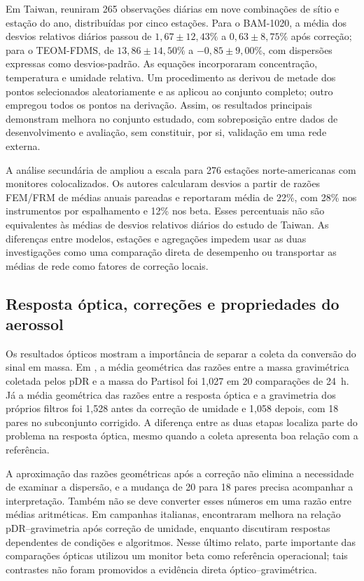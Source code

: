 Em Taiwan, \textcite{rsl085} reuniram 265 observações diárias em nove combinações de sítio e estação do ano, distribuídas por cinco estações. Para o BAM-1020, a média dos desvios relativos diários passou de $1{,}67\pm12{,}43\%$ a $0{,}63\pm8{,}75\%$ após correção; para o TEOM-FDMS, de $13{,}86\pm14{,}50\%$ a $-0{,}85\pm9{,}00\%$, com dispersões expressas como desvios-padrão. As equações incorporaram concentração, temperatura e umidade relativa. Um procedimento as derivou de metade dos pontos selecionados aleatoriamente e as aplicou ao conjunto completo; outro empregou todos os pontos na derivação. Assim, os resultados principais demonstram melhora no conjunto estudado, com sobreposição entre dados de desenvolvimento e avaliação, sem constituir, por si, validação em uma rede externa.

A análise secundária de \textcite{rsl026} ampliou a escala para 276 estações norte-americanas com monitores colocalizados. Os autores calcularam desvios a partir de razões FEM/FRM de médias anuais pareadas e reportaram média de 22\%, com 28\% nos instrumentos por espalhamento e 12\% nos beta. Esses percentuais não são equivalentes às médias de desvios relativos diários do estudo de Taiwan. As diferenças entre modelos, estações e agregações impedem usar as duas investigações como uma comparação direta de desempenho ou transportar as médias de rede como fatores de correção locais.

\subsection{Resposta óptica, correções e propriedades do aerossol}

Os resultados ópticos mostram a importância de separar a coleta da conversão do sinal em massa. Em \textcite{rsl089}, a média geométrica das razões entre a massa gravimétrica coletada pelos pDR e a massa do Partisol foi 1,027 em 20 comparações de 24~h. Já a média geométrica das razões entre a resposta óptica e a gravimetria dos próprios filtros foi 1,528 antes da correção de umidade e 1,058 depois, com 18 pares no subconjunto corrigido. A diferença entre as duas etapas localiza parte do problema na resposta óptica, mesmo quando a coleta apresenta boa relação com a referência.

A aproximação das razões geométricas após a correção não elimina a necessidade de examinar a dispersão, e a mudança de 20 para 18 pares precisa acompanhar a interpretação. Também não se deve converter esses números em uma razão entre médias aritméticas. Em campanhas italianas, \textcite{rsl269} encontraram melhora na relação pDR--gravimetria após correção de umidade, enquanto \textcite{rsl224} discutiram respostas dependentes de condições e algoritmos. Nesse último relato, parte importante das comparações ópticas utilizou um monitor beta como referência operacional; tais contrastes não foram promovidos a evidência direta óptico--gravimétrica.

